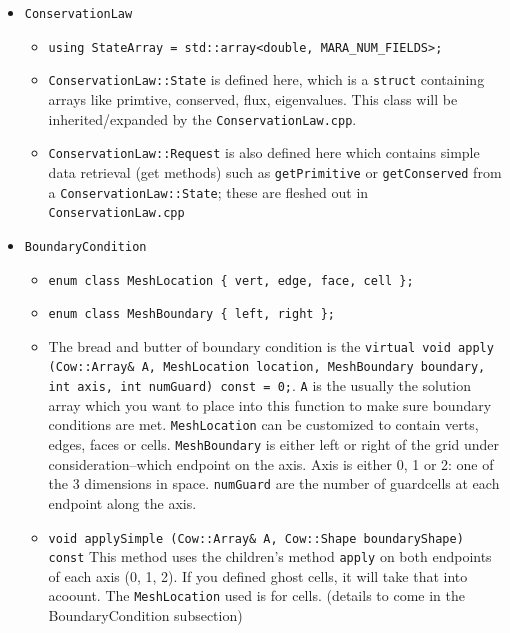 \documentclass{article}
\begin{document}
\begin{itemize}
	\item \texttt{ConservationLaw}
	\begin{itemize}
		\item \texttt{using StateArray = std::array<double, MARA\_NUM\_FIELDS>;}
		\item \texttt{ConservationLaw::State} is defined here, which is a \texttt{struct} containing arrays like primtive, conserved, flux, eigenvalues. This class will be inherited/expanded by the \texttt{ConservationLaw.cpp}.
		\item \texttt{ConservationLaw::Request} is also defined here which contains simple data retrieval (get methods) such as \texttt{getPrimitive} or \texttt{getConserved} from a \texttt{ConservationLaw::State}; these are fleshed out in \texttt{ConservationLaw.cpp}
	\end{itemize}
	\item \texttt{BoundaryCondition}
	\begin{itemize}
		\item \texttt{enum class MeshLocation \{ vert, edge, face, cell \};}
		\item \texttt{enum class MeshBoundary \{ left, right \};}
	
		\item The bread and butter of boundary condition is the \texttt{virtual void apply (Cow::Array\& A, MeshLocation location, MeshBoundary boundary, int axis, int numGuard) const = 0;}. \texttt{A} is the usually the solution array which you want to place into this function to make sure boundary conditions are met. \texttt{MeshLocation} can be customized to contain verts, edges, faces or cells. \texttt{MeshBoundary} is either left or right of the grid under consideration--which endpoint on the axis. Axis is either 0, 1 or 2: one of the 3 dimensions in space. \texttt{numGuard} are the number of guardcells at each endpoint along the axis.
		
		\item \texttt{void applySimple (Cow::Array\& A, Cow::Shape boundaryShape) const} This method uses the children's method \texttt{apply} on both endpoints of each axis (0, 1, 2). If you defined ghost cells, it will take that into acoount. The \texttt{MeshLocation} used is for cells. (details to come in the BoundaryCondition subsection)
	\end{itemize}
	
\end{itemize}
\end{document}
